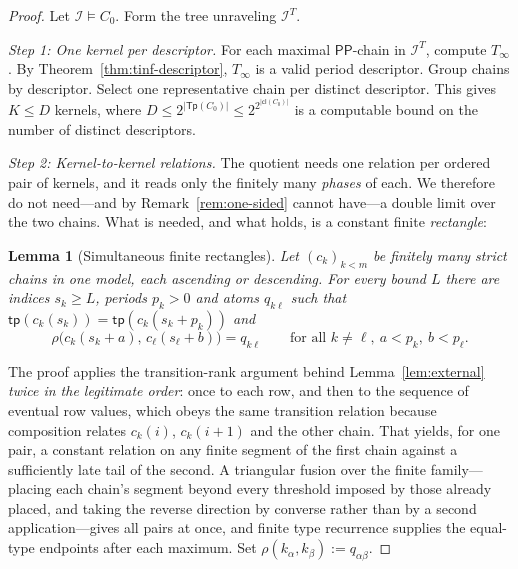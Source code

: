 \documentclass[a4paper,11pt]{article}
\newtheorem{lemma}[theorem]{Lemma}
\theoremstyle{definition}
\newcommand{\PP}{\ensuremath{\mathsf{PP}}}
\newcommand{\cl}{\ensuremath{\mathsf{cl}}}
\newcommand{\tp}{\ensuremath{\mathsf{tp}}}
\newcommand{\Tp}{\ensuremath{\mathsf{Tp}}}
\newcommand{\interp}{\ensuremath{\mathcal{I}}}
\begin{document}
\begin{proof}
Let $\interp \models C_0$.  Form the tree unraveling $\interp^T$.

\medskip\noindent\textit{Step 1: One kernel per descriptor.}\;
For each maximal $\PP$-chain in $\interp^T$, compute $T_\infty$.
By Theorem~\ref{thm:tinf-descriptor}, $T_\infty$ is a valid period
descriptor.  Group chains by descriptor.  Select one representative
chain per distinct descriptor.  This gives $K \le D$ kernels, where
$D \le 2^{|\Tp(C_0)|} \le 2^{2^{|\cl(C_0)|}}$ is a computable
bound on the number of distinct descriptors.

\medskip\noindent\textit{Step 2: Kernel-to-kernel relations.}\;
The quotient needs one relation per ordered pair of kernels, and it
reads only the finitely many \emph{phases} of each.  We therefore do
not need---and by Remark~\ref{rem:one-sided} cannot have---a double
limit over the two chains.  What is needed, and what holds, is a
constant finite \emph{rectangle}:

\begin{lemma}[Simultaneous finite rectangles]\label{lem:rectangle}
Let $(c_k)_{k<m}$ be finitely many strict chains in one model, each
ascending or descending.  For every bound $L$ there are indices
$s_k \ge L$, periods $p_k > 0$ and atoms $q_{k\ell}$ such that
$\tp(c_k(s_k)) = \tp(c_k(s_k+p_k))$ and
\[
  \rho\bigl(c_k(s_k+a),\, c_\ell(s_\ell+b)\bigr) = q_{k\ell}
  \qquad\text{for all } k \ne \ell,\ a<p_k,\ b<p_\ell .
\]
\end{lemma}

\noindent The proof applies the transition-rank argument behind
Lemma~\ref{lem:external} \emph{twice in the legitimate order}: once
to each row, and then to the sequence of eventual row values, which
obeys the same transition relation because composition relates
$c_k(i)$, $c_k(i{+}1)$ and the other chain.  That yields, for one pair,
a constant relation on any finite segment of the first chain against a
sufficiently late tail of the second.  A triangular fusion over the
finite family---placing each chain's segment beyond every threshold
imposed by those already placed, and taking the reverse direction by
converse rather than by a second application---gives all pairs at once,
and finite type recurrence supplies the equal-type endpoints after each
maximum.  Set $\rho(k_\alpha,k_\beta) := q_{\alpha\beta}$.


\end{proof}
\end{document}
